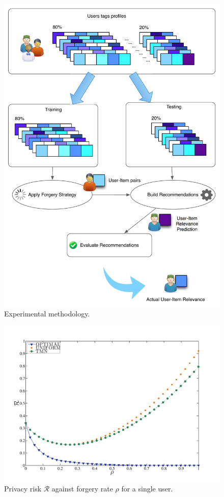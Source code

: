\begin{figure}[htb]  
\includegraphics[width=\textwidth]{figures/strategy.pdf}
\caption[Experimental methodology.]{Experimental methodology.
\label{fig:methodology}}
\end{figure}

\begin{figure}[htb]  
\includegraphics[width=\textwidth]{figures/Fig4b.pdf}
\caption[Privacy Risk against forgery rate for a single user.]{Privacy risk $\mathcal{R}$ against forgery rate $\rho$ for a single user.
\label{fig:Risk-Rho-Single}}
\end{figure}

